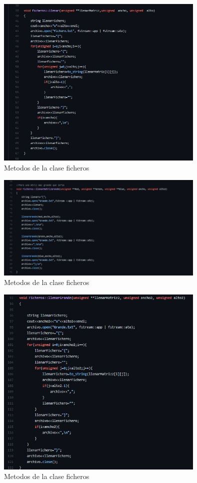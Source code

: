 \documentclass{article}
\begin{document}
\begin{figure}[ht]
\includegraphics[width=10cm]{Imagenes/Metodos de la clase ficheros2.png}
\centering
\caption{Metodos de la clase ficheros}
\label{fig:Metodos de la clase fichero}
\end{figure}

\begin{figure}[ht]
\includegraphics[width=10cm]{Imagenes/Metodos de la clase ficheros3.png}
\centering
\caption{Metodos de la clase ficheros}
\label{fig:Metodos de la clase fichero}
\end{figure}

\begin{figure}[ht]
\includegraphics[width=10cm]{Imagenes/Metodos de la clase ficheros4.png}
\centering
\caption{Metodos de la clase ficheros}
\label{fig:Metodos de la clase fichero}
\end{figure}
\end{document}
